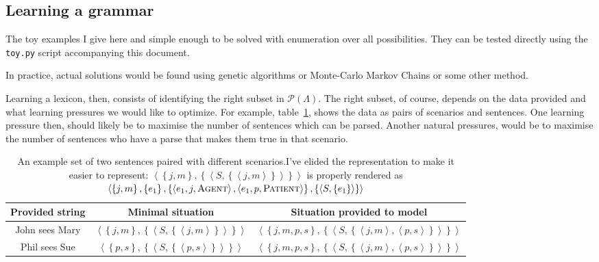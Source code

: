 \documentclass[11pt, a4paper]{article}
\begin{document}
\subsection{Learning a grammar}

\begin{tcolorbox}[colback=blue!5!white,colframe=blue!75!black,title=Finding solutions]
The toy examples I give here and simple enough to be solved with enumeration over all possibilities. 
They can be tested directly using the \texttt{toy.py} script accompanying this document.

In practice, actual solutions would be found using genetic algorithms or Monte-Carlo Markov Chains or some other method.
\end{tcolorbox}


Learning a lexicon, then, consists of identifying the right subset in $\mathcal{P}(\Lambda)$.
The right subset, of course, depends on the data provided and what learning pressures we would like to optimize. 
For example, table~\ref{tab:data}, shows the data as pairs of scenarios and sentences. 
One learning pressure then, should likely be to maximise the number of sentences which can be parsed. 
Another natural pressures, would be to maximise the number of sentences who have a parse that makes them true in that scenario. 
\begin{table}[htb]
\begin{tabular}{ccc}
  \toprule
  Provided string & Minimal situation & Situation provided to model\\ 
  \midrule
  John sees Mary & $\left\langle\left\{j, m\right\}, \left\{\left\langle S, \left\{\left\langle j, m \right\rangle\right\}\right\rangle\right\}\right\rangle$ &
  $\left\langle\left\{j, m, p, s\right\}, \left\{\left\langle S, \left\{\left\langle j, m \right\rangle, \left\langle p, s \right\rangle\right\}\right\rangle\right\}\right\rangle$
  \\
  Phil sees Sue & $\left\langle\left\{p, s\right\}, \left\{\left\langle S, \left\{\left\langle p, s \right\rangle\right\}\right\rangle\right\}\right\rangle$ &
  $\left\langle\left\{j, m, p, s\right\}, \left\{\left\langle S, \left\{\left\langle j, m \right\rangle, \left\langle p, s \right\rangle\right\}\right\rangle\right\}\right\rangle$
  \\
  \bottomrule
\end{tabular}
\caption{An example set of two sentences paired with different scenarios.\label{tab:data}
  I've elided the representation to make it easier to represent: $\left\langle\left\{j, m\right\}, \left\{\left\langle S, \left\{\left\langle j, m \right\rangle\right\}\right\rangle\right\}\right\rangle$ is properly rendered as 
  $\left\langle\left\{j, m\right\}, \left\{e_1\right\}, \left\{\left\langle e_1, j, \textsc{Agent}\right\rangle,\left\langle e_1, p, \textsc{Patient}\right\rangle\right\}, \left\{\left\langle S, \left\{e_1 \right\}\right\rangle \right\}\right\rangle$
  }
\end{table}
\end{document}
